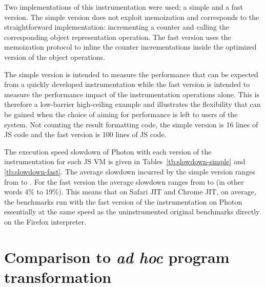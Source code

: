 Two implementations of this instrumentation were used; a simple and a
fast version.  The simple version does not exploit memoization and
corresponds to the straightforward implementation: incrementing a
counter and calling the corresponding object representation
operation. The fast version uses the memoization protocol to inline
the counter incrementations inside the optimized version of the object
operations.

The simple version is intended to measure the performance that can be
expected from a quickly developed instrumentation while the fast
version is intended to measure the performance impact of the
instrumentation operations alone. This is therefore a low-barrier
high-ceiling example and illustrates the flexibility that can be
gained when the choice of aiming for performance is left to users of
the system.  Not counting the result formatting code, the simple
version is 16 lines of JS code and the fast version is 100 lines of
JS code.

The execution speed slowdown of Photon with each version of the
instrumentation for each JS VM is given in
Tables~\ref{tb:slowdown-simple} and \ref{tb:slowdown-fast}.  The
average slowdown incurred by the simple version ranges from  to
.  For the fast version the average slowdown ranges from  to
 (in other words 4\% to 19\%).  This means that on Safari JIT
and Chrome JIT, on average, the benchmarks run with the fast version
of the instrumentation on Photon essentially at the same speed as the
uninstrumented original benchmarks directly on the Firefox
interpreter.

\section{Comparison to \textit{ad hoc} program transformation}
\label{sec:esprof}

